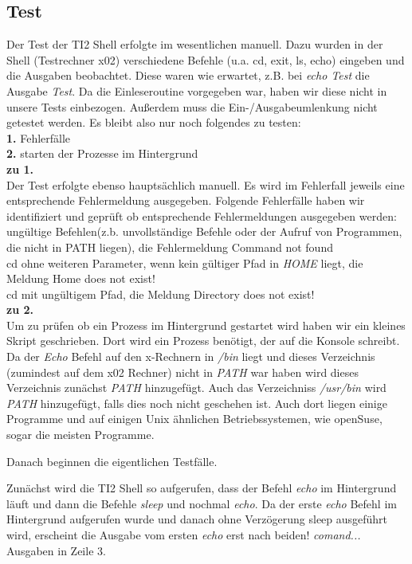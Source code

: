 \documentclass{ti2}
\begin{document}
\subsection*{Test}
Der Test der TI2 Shell erfolgte im wesentlichen manuell. Dazu wurden in der Shell (Testrechner x02) verschiedene Befehle (u.a. cd, exit, ls, echo) eingeben und die Ausgaben beobachtet. Diese waren wie erwartet, z.B. bei \textit{echo Test} die Ausgabe \textit{Test}. Da die Einleseroutine vorgegeben war, haben wir diese nicht in unsere Tests einbezogen. Außerdem muss die Ein-/Ausgabeumlenkung nicht getestet werden. Es bleibt also nur noch folgendes zu testen: \\
\textbf{1.} Fehlerfälle \\
\textbf{2.} starten der Prozesse im Hintergrund \\
\textbf{zu 1.}\\
Der Test erfolgte ebenso hauptsächlich manuell. Es wird im Fehlerfall jeweils eine entsprechende Fehlermeldung ausgegeben. Folgende Fehlerfälle haben wir identifiziert und geprüft ob entsprechende Fehlermeldungen ausgegeben werden: \\
ungültige Befehlen(z.b. unvollständige Befehle oder der Aufruf von Programmen, die nicht in PATH liegen), die Fehlermeldung \glqq Command not found \grqq  \\
cd ohne weiteren Parameter, wenn kein gültiger Pfad in \textit{HOME} liegt, die Meldung \glqq Home does not exist! \grqq  \\
cd mit ungültigem Pfad, die Meldung \glqq Directory does not exist! \grqq \\
\textbf{zu 2.} \\
Um zu prüfen ob ein Prozess im Hintergrund gestartet wird haben wir ein kleines Skript geschrieben. Dort wird ein Prozess benötigt, der auf die Konsole schreibt. Da der \textit{Echo} Befehl auf den x-Rechnern in \textit{/bin} liegt und dieses Verzeichnis (zumindest auf dem x02 Rechner) nicht in \textit{PATH} war haben wird dieses Verzeichnis zunächst \textit{PATH} hinzugefügt. Auch das Verzeichniss \textit{/usr/bin} wird \textit{PATH} hinzugefügt, falls dies noch nicht geschehen ist. Auch dort liegen einige Programme und auf einigen Unix ähnlichen Betriebssystemen, wie openSuse, sogar die meisten Programme. 

Danach beginnen die eigentlichen Testfälle. 

Zunächst wird die TI2 Shell so aufgerufen, dass der Befehl \textit{echo} im Hintergrund läuft und dann die Befehle \textit{sleep} und nochmal \textit{echo}. Da der erste \textit{echo} Befehl im Hintergrund aufgerufen wurde und danach ohne Verzögerung sleep ausgeführt wird, erscheint die Ausgabe vom ersten \textit{echo} erst nach beiden! \textit{comand...} Ausgaben in Zeile 3. \\ \\
\end{document}
